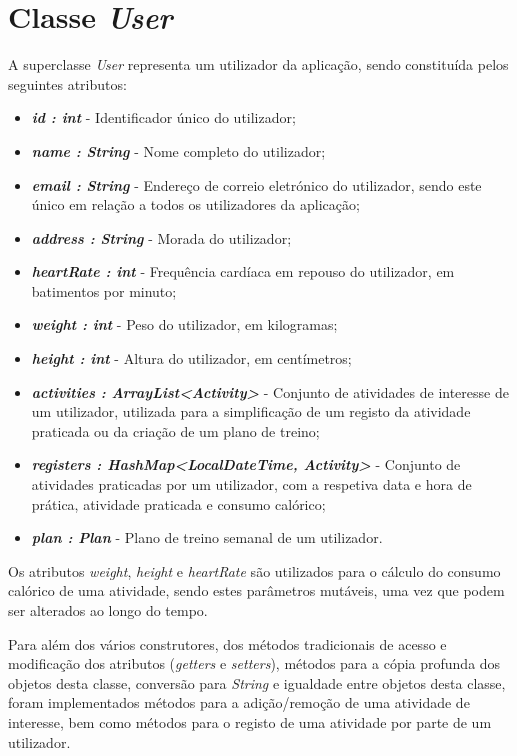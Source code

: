 \documentclass[a4paper,12pt]{scrreprt}
\begin{document}
\clearpage
\section{Classe \textit{User}}
    A superclasse \textit{User} representa um utilizador da aplicação, sendo constituída pelos seguintes atributos:

    \begin{itemize}
        \item \textit{\textbf{id : int}} - Identificador único do utilizador;
        \item \textit{\textbf{name : String}} - Nome completo do utilizador;
        \item \textit{\textbf{email : String}} - Endereço de correio eletrónico do utilizador, sendo este único em relação a todos os utilizadores da aplicação;
        \item \textit{\textbf{address : String}} - Morada do utilizador;
        \item \textit{\textbf{heartRate : int}} - Frequência cardíaca em repouso do utilizador, em batimentos por minuto;
        \item \textit{\textbf{weight : int}} - Peso do utilizador, em kilogramas;
        \item \textit{\textbf{height : int}} - Altura do utilizador, em centímetros;
        \item \textit{\textbf{activities : ArrayList<Activity>}} - Conjunto de atividades de interesse de um utilizador, utilizada para a simplificação de um registo da atividade praticada ou da criação de um plano de treino;
        \item \textit{\textbf{registers : HashMap<LocalDateTime, Activity>}} - Conjunto de atividades praticadas por um utilizador, com a respetiva data e hora de prática, atividade praticada e consumo calórico;
        \item \textit{\textbf{plan : Plan}} - Plano de treino semanal de um utilizador.
    \end{itemize}

    Os atributos \textit{weight}, \textit{height} e \textit{heartRate} são utilizados para o cálculo do consumo calórico de uma atividade,
    sendo estes parâmetros mutáveis, uma vez que podem ser alterados ao longo do tempo.

    Para além dos vários construtores, dos métodos tradicionais de acesso e modificação dos atributos (\textit{getters} e \textit{setters}), métodos para a cópia profunda dos objetos desta classe, conversão para \textit{String} e igualdade entre objetos desta classe, foram implementados métodos para a adição/remoção de uma atividade de interesse, bem como métodos para o registo de uma atividade por parte de um utilizador.
\end{document}
